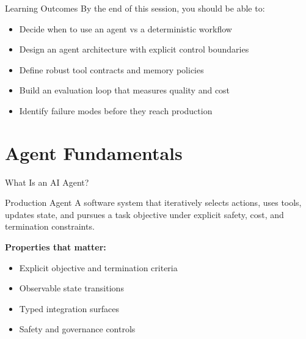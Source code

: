 \documentclass[aspectratio=169]{beamer}
\begin{document}
\begin{frame}{Learning Outcomes}
  By the end of this session, you should be able to:
  \begin{itemize}
    \item Decide when to use an agent vs a deterministic workflow
    \item Design an agent architecture with explicit control boundaries
    \item Define robust tool contracts and memory policies
    \item Build an evaluation loop that measures quality and cost
    \item Identify failure modes before they reach production
  \end{itemize}
\end{frame}

\section{Agent Fundamentals}

\begin{frame}{What Is an AI Agent?}
  \begin{definitionbox}{Production Agent}
    A software system that iteratively selects actions, uses tools, updates state, and pursues a task objective under explicit safety, cost, and termination constraints.
  \end{definitionbox}

  \vspace{0.4em}
  \textbf{Properties that matter:}
  \begin{itemize}
    \item Explicit objective and termination criteria
    \item Observable state transitions
    \item Typed integration surfaces
    \item Safety and governance controls
  \end{itemize}
\end{frame}
\end{document}
